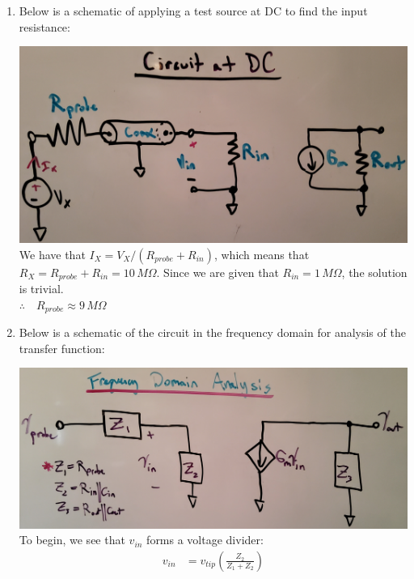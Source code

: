 \documentclass[12pt, fleqn]{article}
\begin{document}
\begin{enumerate}[label=(\roman*)]
    \item
    {
    Below is a schematic of applying a test source at DC to find the input resistance:

    \includegraphics[scale=0.1, center]{p1a1.jpg}\\

    We have that $I_X = V_X/(R_{probe} + R_{in})$, which means that $R_X = R_{probe} + R_{in} = 10\,M\Omega$.  Since we are given that $R_{in} = 1\,M\Omega$, the solution is trivial.\\[0.5cm]    
    $\therefore \quad \boxed{R_{probe} \approx 9\,M\Omega}$
    }
    \item
    {
    Below is a schematic of the circuit in the frequency domain for analysis of the transfer function:

    \includegraphics[scale=0.125, center]{p1fd.jpg}\\
    
    To begin, we see that $v_{in}$ forms a voltage divider:
    \begin{align*}
        v_{in} &= v_{tip}\left(\frac{Z_2}{Z_1 + Z_2}\right)
    \end{align*}
    
}
\end{enumerate}
\end{document}
